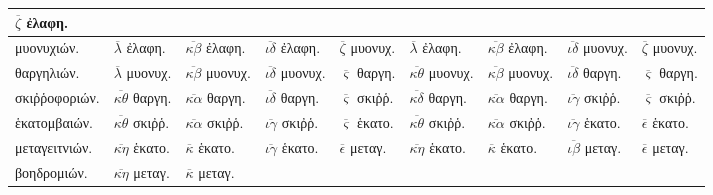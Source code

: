 \begin{tabular}{l llllllll}
$\overline{\zeta}$           \textgreek{ἐλαφη.}
\\
\hline
\textgreek{μυονυχιών.} &
$\overline{\lambda}$         \textgreek{ἐλαφη.} &
$\overline{\kappa\beta}$     \textgreek{ἐλαφη.} &
$\overline{\iota\delta}$     \textgreek{ἐλαφη.} &
$\overline{\zeta}$           \textgreek{μυονυχ.} &
$\overline{\lambda}$         \textgreek{ἐλαφη.} &
$\overline{\kappa\beta}$     \textgreek{ἐλαφη.} &
$\overline{\iota\delta}$     \textgreek{μυονυχ.} &
$\overline{\zeta}$           \textgreek{μυονυχ.}
\\
\textgreek{θαργηλιών.} &
$\overline{\lambda}$         \textgreek{μυονυχ.} &
$\overline{\kappa\beta}$     \textgreek{μυονυχ.} &
$\overline{\iota\delta}$     \textgreek{μυονυχ.} &
$\overline{\varsigma}$       \textgreek{θαργη.} &
$\overline{\kappa\theta}$    \textgreek{μυονυχ.} &
$\overline{\kappa\beta}$     \textgreek{μυονυχ.} &
$\overline{\iota\delta}$     \textgreek{θαργη.} &
$\overline{\varsigma}$       \textgreek{θαργη.}
\\
\textgreek{σκιῤῥοφοριών.} &
$\overline{\kappa\theta}$    \textgreek{θαργη.} &
$\overline{\kappa\alpha}$    \textgreek{θαργη.} &
$\overline{\iota\delta}$     \textgreek{θαργη.} &
$\overline{\varsigma}$       \textgreek{σκιῤῥ.} &
$\overline{\kappa\delta}$    \textgreek{θαργη.} &
$\overline{\kappa\alpha}$    \textgreek{θαργη.} &
$\overline{\iota\gamma}$     \textgreek{σκιῤῥ.} &
$\overline{\varsigma}$       \textgreek{σκιῤῥ.}
\\
\hline
\textgreek{ἑκατομβαιών.} &
$\overline{\kappa\theta}$    \textgreek{σκιῤῥ.} &
$\overline{\kappa\alpha}$    \textgreek{σκιῤῥ.} &
$\overline{\iota\gamma}$     \textgreek{σκιῤῥ.} &
$\overline{\varsigma}$       \textgreek{ἑκατο.} &
$\overline{\kappa\theta}$    \textgreek{σκιῤῥ.} &
$\overline{\kappa\alpha}$    \textgreek{σκιῤῥ.} &
$\overline{\iota\gamma}$     \textgreek{ἑκατο.} &
$\overline{\epsilon}$        \textgreek{ἑκατο.}
\\
\textgreek{μεταγειτνιών.} &
$\overline{\kappa\eta}$      \textgreek{ἑκατο.} &
$\overline{\kappa}$          \textgreek{ἑκατο.} &
$\overline{\iota\gamma}$     \textgreek{ἑκατο.} &
$\overline{\epsilon}$        \textgreek{μεταγ.} &
$\overline{\kappa\eta}$      \textgreek{ἑκατο.} &
$\overline{\kappa}$          \textgreek{ἑκατο.} &
$\overline{\iota\beta}$      \textgreek{μεταγ.} &
$\overline{\epsilon}$        \textgreek{μεταγ.}
\\
\textgreek{βοηδρομιών.} &
$\overline{\kappa\eta}$      \textgreek{μεταγ.} &
$\overline{\kappa}$          \textgreek{μεταγ.} &

\end{tabular}
